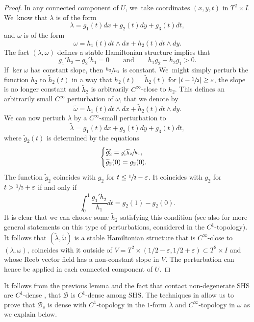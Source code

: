 \documentclass[11pt]{article}
\theoremstyle{definition}
\begin{document}
\begin{proof}
In any connected component of $U$, we~take coordinates $(x,y,t)$ in $T^2\times I$. We~know that $\lambda$ is of the form
\[
\lambda= g_1(t) dx + g_2(t) dy + g_3(t)dt,
\]
and $\omega$ is of the form
\[
\omega= h_1(t)dt\wedge dx + h_2(t)dt\wedge dy.
\]
The fact $(\lambda,\omega)$ defines a stable Hamiltonian structure implies that
\[
g_1'h_2-g_2'h_1=0 \qquad \mbox{and} \qquad h_1g_2-h_2g_1>0.
\]
If $\ker \omega$ has constant slope, then $\sfrac{h_2}{h_1}$ is constant. We~might simply perturb the function $h_2$ to $\widetilde h_2(t)$ in a way that $h_2(t)=\widetilde h_2(t)$ for $|t-\sfrac{1}{2}|\geq \varepsilon$, the slope is no longer constant and $\widetilde h_2$ is arbitrarily $C^\infty$-close to $h_2$. This defines an arbitrarily small $C^\infty$ perturbation of $\omega$, that we denote by
\[
\widetilde \omega= h_1(t) dt\wedge dx + \widetilde h_2(t) dt\wedge dy.
\]
We can now perturb $\lambda$ by a $C^\infty$-small perturbation to
\[
\widetilde \lambda= g_1(t)dx+ \widetilde g_2(t)dy+g_3(t)dt,
\]
where $\widetilde g_2(t)$ is determined by the equations
\begin{equation*}
\begin{cases}
\widetilde g_2'=\sfrac{g_1'\widetilde h_2}{h_1},\\
\widetilde g_2(0)=g_2(0).
\end{cases}
\end{equation*}
The function $\widetilde g_2$ coincides with $g_2$ for $t\leq \sfrac{1}{2}-\varepsilon$. It coincides with $g_2$ for $t > \sfrac{1}{2}+\varepsilon$ if and only if
\[
\int_0^1 \frac{g_1'\widetilde h_2}{h_1}dt=g_2(1)-g_2(0).
\]
It is clear that we can choose some $\widetilde h_2$ satisfying this condition (see also \cite[Lem.\,3.15]{CV1} for more general statements on this type of perturbations, considered in the $C^1$\nobreakdash-topo\-logy). It follows that $(\widetilde \lambda,\widetilde \omega)$ is a stable Hamiltonian structure that is $C^\infty$-close to $(\lambda,\omega)$, coincides with it outside of $V=T^2\times(1/2-\varepsilon,1/2+\varepsilon)\subset T^2\times I$ and whose Reeb vector field has a non-constant slope in $V$. The perturbation can hence be applied in each connected component of $U$.
\end{proof}

It follows from the previous lemma and the fact that contact non-degenerate SHS are $C^1$-dense \cite[Th.\,4.6]{CV1}, that $\mathcal{B}$ is $C^1$-dense among SHS. The techniques in \cite[Th.\,4.6]{CV1} allow us to prove that $\mathcal{B}_s$ is dense with $C^1$-topology in the $1$-form $\lambda$ and $C^\infty$-topology in $\omega$ as we explain below.
\end{document}
